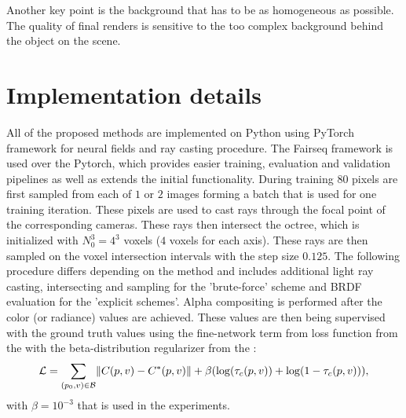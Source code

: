 Another key point is the background that has to be as homogeneous as possible.
The quality of final renders is sensitive to the too complex background behind the object on the scene.





\section{Implementation details}

All of the proposed methods are implemented on Python
using PyTorch \cite{pytorch} framework
for neural fields and ray casting procedure.
The Fairseq \cite{ott2019fairseq} framework is used over the Pytorch,
which provides easier training, evaluation and validation pipelines as well as extends the initial functionality.
During training $80$ pixels are first sampled from each of $1$ or $2$ images 
forming a batch that is used for one training iteration.
These pixels are used to cast rays through the focal point of the corresponding cameras.
These rays then intersect the octree, which is initialized with $N_0^3 = 4^3$ voxels ($4$ voxels for each axis).
These rays are then sampled on the voxel intersection intervals with the step size $0.125$.
The following procedure differs depending on the method
and includes additional light ray casting, intersecting and sampling for the 'brute-force' scheme and BRDF evaluation for the 'explicit schemes'.
Alpha compositing is performed after the color (or radiance) values are achieved.
These values are then being supervised with the ground truth values using the fine-network term from loss function from the  with the beta-distribution regularizer from the :
\begin{equation}
    \mathcal{L} = \sum_{(p_0,v)\in\mathcal{B}} \norm{ C(p, v) - C^*(p, v) } + \beta(\log(\tau_c(p, v)) + \log(1 - \tau_c(p, v))),
\end{equation}
with $\beta = 10^{-3}$ that is used in the experiments.

